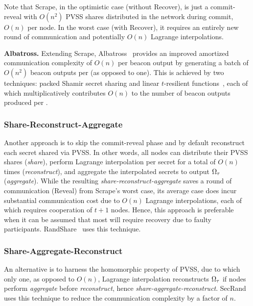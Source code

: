 Note that Scrape, in the optimistic case (without Recover), is just a commit-reveal with $O(n^2)$ PVSS shares distributed in the network during commit, $O(n)$ per node. In the worst case (with Recover), it requires an entirely new round of communication and potentially $O(n)$ Lagrange interpolations.

\noindent\textbf{Albatross.} Extending Scrape, Albatross~\cite{cascudo2020albatross} provides an improved amortized communication complexity of $O(n)$ per beacon output by generating a batch of $O(n^2)$ beacon outputs per \epoch (as opposed to one). This is achieved by two techniques: packed Shamir secret sharing and linear $t$-resilient functions~\cite{cascudo2020albatross}, each of which multiplicatively contributes $O(n)$ to the number of beacon outputs produced per \epoch.

\subsubsection{Share-Reconstruct-Aggregate}
Another approach is to skip the commit-reveal phase and by default reconstruct each secret shared via PVSS. In other words, all nodes can distribute their PVSS shares (\textit{share}), perform Lagrange interpolation per secret for a total of $O(n)$ times (\textit{reconstruct}), and aggregate the interpolated secrets to output $\Omega_\tau$ (\textit{aggregate}). While the resulting \textit{share-reconstruct-aggregate} saves a round of communication (Reveal) from Scrape's worst case, its average case does incur substantial communication cost due to $O(n)$ Lagrange interpolations, each of which requires cooperation of $t + 1$ nodes. Hence, this approach is preferable when it can be assumed that most \epochs will require recovery due to faulty participants. RandShare~\cite{syta2017scalable} uses this technique.

\subsubsection{Share-Aggregate-Reconstruct}
An alternative is to harness the homomorphic property of PVSS, due to which only one, as opposed to $O(n)$, Lagrange interpolation reconstructs $\Omega_\tau$ if nodes perform \textit{aggregate} before \textit{reconstruct}, hence \textit{share-aggregate-reconstruct}. SecRand~\cite{guo2020secRand} uses this technique to reduce the communication complexity by a factor of $n$.

